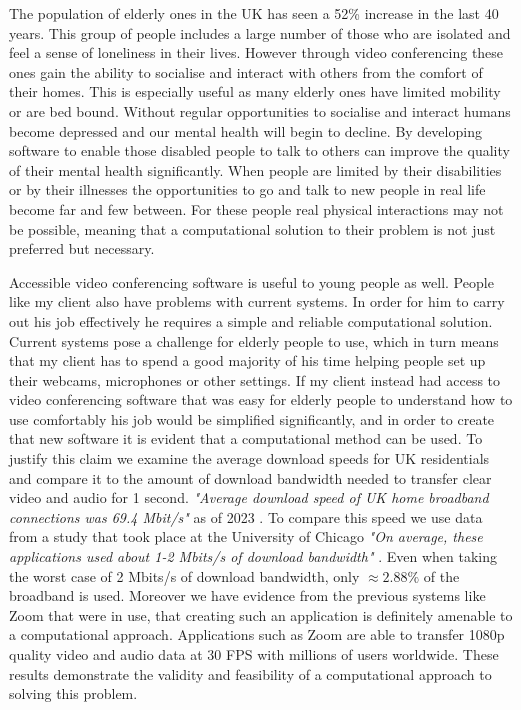The population of elderly ones in the UK has seen a 52\%
increase in the last 40 years. This group of people includes
a large number of those who are isolated and feel a sense of
loneliness in their lives. However through video conferencing
these ones gain the ability to socialise and interact with
others from the comfort of their homes. This is especially
useful as many elderly ones have limited mobility or are bed
bound. Without regular opportunities to socialise and interact
humans become depressed and our mental health will begin to
decline. By developing software to enable those disabled
people to talk to others can improve the quality of their
mental health significantly. When people are limited by their
disabilities or by their illnesses the opportunities to go and
talk to new people in real life become far and few between. For
these people real physical interactions may not be possible,
meaning that a computational solution to their problem is not
just preferred but necessary. \vspace{0.2cm}

Accessible video conferencing software is useful to young
people as well. People like my client also have problems with
current systems. In order for him to carry out his job
effectively he requires a simple and reliable computational
solution. Current systems pose a challenge for elderly people
to use, which in turn means that my client has to spend a good
majority of his time helping people set up their webcams,
microphones or other settings. If my client instead had access
to video conferencing software that was easy for elderly people
to understand how to use comfortably his job would be
simplified significantly, and in order to create that new
software it is evident that a computational method can be
used. To justify this claim we examine the average download
speeds for UK residentials and compare it to the amount of
download bandwidth needed to transfer clear video and audio
for 1 second. \textit{"Average download speed of UK home
broadband connections was 69.4 Mbit/s"} as of 2023 \cite{data}.
To compare this speed we use data from a study that took place
at the University of Chicago \textit{"On average, these
applications used about 1-2 Mbits/s of download bandwidth"}
\cite{chicago}. Even when taking the worst case of 2 Mbits/s
of download bandwidth, only $\approx 2.88\%$ of the broadband
is used. Moreover we have evidence from the previous systems
like Zoom that were in use, that creating such an application
is definitely amenable to a computational approach.
Applications such as Zoom are able to transfer 1080p quality
video and audio data at 30 FPS with millions of users
worldwide. These results demonstrate the validity and
feasibility of a computational approach to solving this
problem. \\ \vspace{0.2cm}

